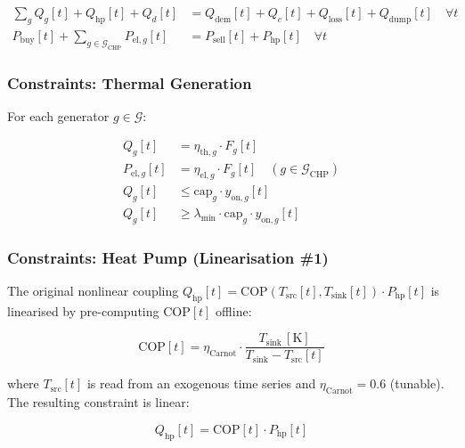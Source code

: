 \documentclass[a4paper,fleqn]{cas-sc}
\newcommand{\Qloss}{Q_{\mathrm{loss}}}
\newcommand{\Qhp}{Q_{\mathrm{hp}}}
\newcommand{\Php}{P_{\mathrm{hp}}}
\newcommand{\COP}{\mathrm{COP}}
\begin{document}
\begin{align}
  \sum_{g} Q_g[t] + \Qhp[t] + Q_d[t]
    &= Q_{\mathrm{dem}}[t] + Q_c[t] + \Qloss[t] + Q_{\mathrm{dump}}[t]
    \quad\forall t \tag{HB} \label{eq:hb}\\
  P_{\mathrm{buy}}[t] + \sum_{g \in \mathcal{G}_{\mathrm{CHP}}} P_{\mathrm{el},g}[t]
    &= P_{\mathrm{sell}}[t] + \Php[t]
    \quad\forall t \tag{EB} \label{eq:eb}
\end{align}

\subsubsection{Constraints: Thermal Generation}

For each generator $g \in \mathcal{G}$:

\begin{align}
  Q_g[t] &= \eta_{\mathrm{th},g} \cdot F_g[t] \tag{1}\\
  P_{\mathrm{el},g}[t] &= \eta_{\mathrm{el},g} \cdot F_g[t]
    \quad (g \in \mathcal{G}_{\mathrm{CHP}}) \tag{2}\\
  Q_g[t] &\leq \mathrm{cap}_g \cdot y_{\mathrm{on},g}[t] \tag{3}\\
  Q_g[t] &\geq \lambda_{\min} \cdot \mathrm{cap}_g \cdot y_{\mathrm{on},g}[t] \tag{4}
\end{align}

\subsubsection{Constraints: Heat Pump (Linearisation \#1)}
\label{sec:cop_lin}

The original nonlinear coupling
$\Qhp[t] = \COP(T_{\mathrm{src}}[t], T_{\mathrm{sink}}[t]) \cdot \Php[t]$
is linearised by pre-computing $\COP[t]$ offline:

\begin{equation}
  \COP[t] = \eta_{\mathrm{Carnot}} \cdot \frac{T_{\mathrm{sink}}\,[\si{\kelvin}]}
            {T_{\mathrm{sink}} - T_{\mathrm{src}}[t]} \tag{5} \label{eq:cop}
\end{equation}

where $T_{\mathrm{src}}[t]$ is read from an exogenous time series and
$\eta_{\mathrm{Carnot}} = 0.6$ (tunable).  The resulting constraint is linear:

\begin{equation}
  \Qhp[t] = \COP[t] \cdot \Php[t] \tag{6} \label{eq:hp_lin}
\end{equation}
\end{document}

